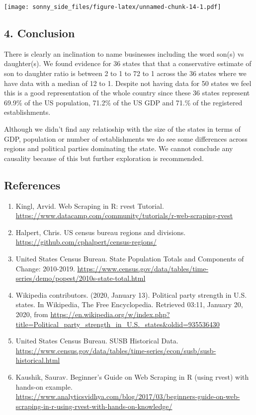 \documentclass[]{article}
\begin{document}
\texttt{[image: sonny\_side\_files/figure-latex/unnamed-chunk-14-1.pdf]}

\hypertarget{conclusion}{%
\subsection{4. Conclusion}\label{conclusion}}

There is clearly an inclination to name businesses including the word
son(s) vs daughter(s). We found evidence for 36 states that that a
conservative estimate of son to daughter ratio is between 2 to 1 to 72
to 1 across the 36 states where we have data with a median of 12 to 1.
Despite not having data for 50 states we feel this is a good
representation of the whole country since these 36 states represent
69.9\% of the US population, 71.2\% of the US GDP and 71.\% of the
registered establishments.

Although we didn't find any relatioship with the size of the states in
terms of GDP, population or number of establishments we do see some
differences across regions and political parties dominating the state.
We cannot conclude any causality because of this but further exploration
is recommended.

\hypertarget{references}{%
\subsection{References}\label{references}}

\begin{enumerate}
\def\labelenumi{\arabic{enumi}.}
\item
  Kingl, Arvid. Web Scraping in R: rvest Tutorial.
  \url{https://www.datacamp.com/community/tutorials/r-web-scraping-rvest}
\item
  Halpert, Chris. US census bureau regions and divisions.
  \url{https://github.com/cphalpert/census-regions/}
\item
  United States Census Bureau. State Population Totals and Components of
  Change: 2010-2019.
  \url{https://www.census.gov/data/tables/time-series/demo/popest/2010s-state-total.html}
\item
  Wikipedia contributors. (2020, January 13). Political party strength
  in U.S. states. In Wikipedia, The Free Encyclopedia. Retrieved 03:11,
  January 20, 2020, from
  \url{https://en.wikipedia.org/w/index.php?title=Political_party_strength_in_U.S._states\&oldid=935536430}
\item
  United States Census Bureau. SUSB Historical Data.
  \url{https://www.census.gov/data/tables/time-series/econ/susb/susb-historical.html}
\item
  Kaushik, Saurav. Beginner's Guide on Web Scraping in R (using rvest)
  with hands-on example.
  \url{https://www.analyticsvidhya.com/blog/2017/03/beginners-guide-on-web-scraping-in-r-using-rvest-with-hands-on-knowledge/}
\end{enumerate}
\end{document}
